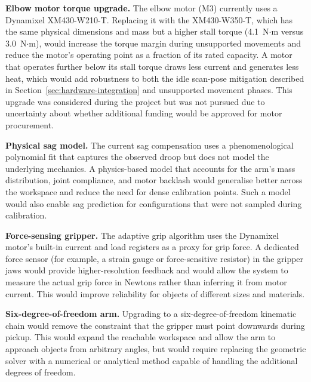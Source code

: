 \textbf{Elbow motor torque upgrade.} The elbow motor (M3)
currently uses a Dynamixel XM430-W210-T. Replacing it with the
XM430-W350-T, which has the same physical dimensions and mass
but a higher stall torque (4.1~N$\cdot$m versus 3.0~N$\cdot$m),
would increase the torque margin during unsupported movements and
reduce the motor's operating point as a fraction of its rated capacity.
A motor that operates further below its stall torque draws less
current and generates less heat, which would add robustness to both the
idle scan-pose mitigation described in Section~\ref{sec:hardware-integration} and unsupported
movement phases. This upgrade was
considered during the project but was not pursued due to
uncertainty about whether additional funding would be approved
for motor procurement.

\textbf{Physical sag model.} The current sag compensation uses
a phenomenological polynomial fit that captures the observed
droop but does not model the underlying mechanics. A
physics-based model that accounts for the arm's mass
distribution, joint compliance, and motor backlash would
generalise better across the workspace and reduce the need
for dense calibration points. Such a model would also enable
sag prediction for configurations that were not sampled
during calibration.

\textbf{Force-sensing gripper.} The adaptive grip algorithm
uses the Dynamixel motor's built-in current and load registers
as a proxy for grip force. A dedicated force sensor
(for example, a strain gauge or force-sensitive resistor) in
the gripper jaws would provide higher-resolution feedback and
would allow the system to measure the actual grip force in
Newtons rather than inferring it from motor current. This
would improve reliability for objects of different sizes and
materials.

\textbf{Six-degree-of-freedom arm.} Upgrading to a
six-degree-of-freedom kinematic chain would remove the
constraint that the gripper must point downwards during
pickup. This would expand the reachable workspace and allow
the arm to approach objects from arbitrary angles, but would
require replacing the geometric solver with a numerical or
analytical method capable of handling the additional degrees
of freedom.
